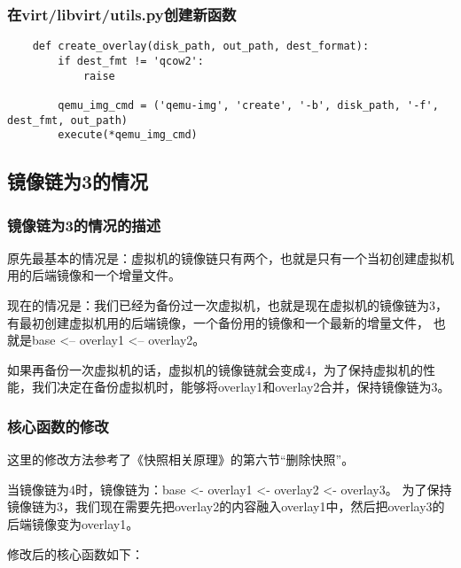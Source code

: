 \documentclass[a4paper,left=1.5cm,right=1.5cm,11pt]{article}
\begin{document}
\subsubsection{在virt/libvirt/utils.py创建新函数}
    \begin{lstlisting}
    def create_overlay(disk_path, out_path, dest_format):
        if dest_fmt != 'qcow2':
            raise

        qemu_img_cmd = ('qemu-img', 'create', '-b', disk_path, '-f', dest_fmt, out_path)
        execute(*qemu_img_cmd)
    \end{lstlisting}

\clearpage

\subsection{镜像链为3的情况}
\subsubsection{镜像链为3的情况的描述}
    原先最基本的情况是：虚拟机的镜像链只有两个，也就是只有一个当初创建虚拟机用的后端镜像和一个增量文件。\par

    现在的情况是：我们已经为备份过一次虚拟机，也就是现在虚拟机的镜像链为3，有最初创建虚拟机用的后端镜像，一个备份用的镜像和一个最新的增量文件，
    也就是base <-- overlay1 <-- overlay2。\par

    如果再备份一次虚拟机的话，虚拟机的镜像链就会变成4，为了保持虚拟机的性能，我们决定在备份虚拟机时，能够将overlay1和overlay2合并，保持镜像链为3。

\subsubsection{核心函数的修改}
    这里的修改方法参考了《快照相关原理》的第六节“删除快照”。\par

    当镜像链为4时，镜像链为：base <- overlay1 <- overlay2 <- overlay3。
    为了保持镜像链为3，我们现在需要先把overlay2的内容融入overlay1中，然后把overlay3的后端镜像变为overlay1。\par

    修改后的核心函数如下：
\end{document}
